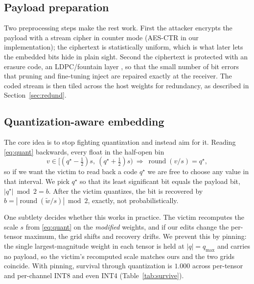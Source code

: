\documentclass[a4paper,fleqn]{cas-dc}
\theoremstyle{plain}
\theoremstyle{remark}
\begin{document}
\subsection{Payload preparation}
Two preprocessing steps make the rest work. First the attacker encrypts the payload
with a stream cipher in counter mode (AES-CTR in our implementation); the ciphertext is
statistically uniform, which is what later lets the embedded bits hide in plain sight.
Second the ciphertext is protected with an erasure code, an LDPC/fountain layer
\cite{luby2002lt}, so that the small number of bit errors that pruning and fine-tuning
inject are repaired exactly at the receiver. The coded stream is then tiled across the
host weights for redundancy, as described in Section~\ref{sec:redund}.

\subsection{Quantization-aware embedding}
The core idea is to stop fighting quantization and instead aim for it. Reading
\eqref{eq:quant} backwards, every float in the half-open bin
\begin{equation}\label{eq:bin}
v\in\big[(q^\star-\tfrac12)s,\ (q^\star+\tfrac12)s\big)
\ \Longrightarrow\ \operatorname{round}(v/s)=q^\star,
\end{equation}
so if we want the victim to read back a code $q^\star$ we are free to choose any value
in that interval. We pick $q^\star$ so that its least significant bit equals the
payload bit, $|q^\star|\bmod 2 = b$. After the victim quantizes, the bit is recovered
by $\hat b=|\!\operatorname{round}(\tilde w/s)|\bmod 2$, exactly, not probabilistically.

One subtlety decides whether this works in practice. The victim recomputes the scale
$s$ from \eqref{eq:quant} on the \emph{modified} weights, and if our edits change the
per-tensor maximum, the grid shifts and recovery drifts. We prevent this by pinning:
the single largest-magnitude weight in each tensor is held at $|q|{=}q_{\max}$ and
carries no payload, so the victim's recomputed scale matches ours and the two grids
coincide. With pinning, survival through quantization is $1.000$ across per-tensor and
per-channel INT8 and even INT4 (Table~\ref{tab:survive}).
\end{document}
